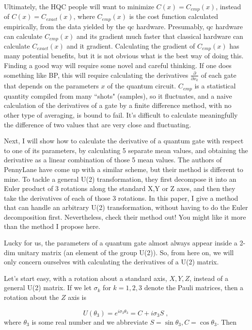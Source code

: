 \documentclass[12pt]{article}
\newcommand{\beq}{\begin{equation}}
\newcommand{\eeq}{\end{equation}}
\begin{document}
Ultimately, the
HQC people will want to minimize $C(x)=C_{emp}(x)$,
instead of $C(x)=C_{exact}(x)$,
where $C_{emp}(x)$ is the cost function calculated
empirically, from the data yielded by the qc
hardware. Presumably, qc
hardware
can calculate $C_{emp}(x)$
and its gradient
much faster
that classical hardware
can calculate $C_{exact}(x)$
and it gradient.
Calculating the gradient
of $C_{emp}(x)$
has many potential
benefits,
but it is not
obvious
what is the best way of doing this.
Finding a good way will require
some novel and
careful thinking. If one does
something like BP,
this will require calculating the derivatives
$\frac{\partial}{\partial x_k}$ of
each gate that depends on the parameters $x$
of the quantum circuit.
$C_{emp}$ is a statistical quantity
compiled from many ``shots" (samples), so
it fluctuates, and a naive calculation of
the derivatives of a gate
by a finite difference method,
with no other type of averaging, is bound to fail.
It's difficult to calculate meaningfully
the difference of two values that
are very close and fluctuating.

Next, I will show how to calculate
the derivative of
a quantum gate with respect
to one of its parameters,
by calculating 5 separate mean values,
and obtaining the derivative
as a linear combination of those 5 mean values.
The authors of PennyLane
have come up with a similar
scheme, but their method
is different to mine.
To tackle a
general U(2)
transformation,
they first decompose
it
into an Euler
product of 3 rotations along
the standard X,Y or Z axes,
and then they take the derivatives
of each of those 3 rotations.
In this paper,
I
give a
method that can
handle an arbitrary
U(2)
transformation,
without
having to
do the Euler
decomposition first.
Nevertheless, check their method out!
You might like it more than the
method I propose here.

Lucky for us,
the parameters of a quantum gate
almost always appear inside
a 2-dim unitary matrix (an element
of the group U(2)).
So, from here on, we will only concern ourselves
with calculating the derivatives
of a U(2) matrix.


Let's start easy, with a rotation about
a standard axis, $X, Y, Z$,
instead of a general U(2) matrix.
If we let
 $\sigma_k$ for $k=1,2,3$ denote the Pauli matrices,
 then a rotation about the $Z$ axis
 is

\beq
U(\theta_3) = e^{i\sigma_3\theta_3} = C + i\sigma_3 S
\;,
\eeq
where
$\theta_3$
is some real number and
we abbreviate $S = \sin\theta_3, C = \cos \theta_3$.
Then
\end{document}
